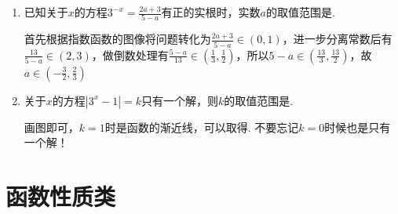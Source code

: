 \begin{enumerate}
    \item 已知关于$x$的方程$3^{-x} = \frac{2a+3}{5-a}$有正的实根时，实数$a$的取值范围是.
    \begin{jieda}
        首先根据指数函数的图像将问题转化为$\frac{2a+3}{5-a} \in (0, 1)$，进一步分离常数后有$\frac{13}{5-a} \in (2, 3)$，做倒数处理有$\frac{5-a}{13} \in (\frac{1}{3}, \frac{1}{2})$，所以$5-a \in (\frac{13}{3}, \frac{13}{2})$，故$a \in (-\frac{3}{2}, \frac{2}{3})$
    \end{jieda}
    \item 关于$x$的方程$|3^x-1| = k$只有一个解，则$k$的取值范围是\blkda[3]{$[1, +\infty) \cup \{0\}$}.
    \begin{jieda}
        画图即可，$k = 1$时是函数的渐近线，可以取得. 不要忘记$k = 0$时候也是只有一个解！
    \end{jieda}
\end{enumerate}
\section*{函数性质类}
